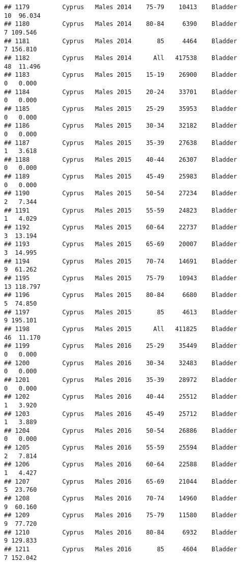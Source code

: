 \documentclass[
]{article}
\begin{document}
\begin{verbatim}
## 1179         Cyprus   Males 2014    75-79    10413    Bladder     10  96.034
## 1180         Cyprus   Males 2014    80-84     6390    Bladder      7 109.546
## 1181         Cyprus   Males 2014       85     4464    Bladder      7 156.810
## 1182         Cyprus   Males 2014      All   417538    Bladder     48  11.496
## 1183         Cyprus   Males 2015    15-19    26900    Bladder      0   0.000
## 1184         Cyprus   Males 2015    20-24    33701    Bladder      0   0.000
## 1185         Cyprus   Males 2015    25-29    35953    Bladder      0   0.000
## 1186         Cyprus   Males 2015    30-34    32182    Bladder      0   0.000
## 1187         Cyprus   Males 2015    35-39    27638    Bladder      1   3.618
## 1188         Cyprus   Males 2015    40-44    26307    Bladder      0   0.000
## 1189         Cyprus   Males 2015    45-49    25983    Bladder      0   0.000
## 1190         Cyprus   Males 2015    50-54    27234    Bladder      2   7.344
## 1191         Cyprus   Males 2015    55-59    24823    Bladder      1   4.029
## 1192         Cyprus   Males 2015    60-64    22737    Bladder      3  13.194
## 1193         Cyprus   Males 2015    65-69    20007    Bladder      3  14.995
## 1194         Cyprus   Males 2015    70-74    14691    Bladder      9  61.262
## 1195         Cyprus   Males 2015    75-79    10943    Bladder     13 118.797
## 1196         Cyprus   Males 2015    80-84     6680    Bladder      5  74.850
## 1197         Cyprus   Males 2015       85     4613    Bladder      9 195.101
## 1198         Cyprus   Males 2015      All   411825    Bladder     46  11.170
## 1199         Cyprus   Males 2016    25-29    35449    Bladder      0   0.000
## 1200         Cyprus   Males 2016    30-34    32483    Bladder      0   0.000
## 1201         Cyprus   Males 2016    35-39    28972    Bladder      0   0.000
## 1202         Cyprus   Males 2016    40-44    25512    Bladder      1   3.920
## 1203         Cyprus   Males 2016    45-49    25712    Bladder      1   3.889
## 1204         Cyprus   Males 2016    50-54    26886    Bladder      0   0.000
## 1205         Cyprus   Males 2016    55-59    25594    Bladder      2   7.814
## 1206         Cyprus   Males 2016    60-64    22588    Bladder      1   4.427
## 1207         Cyprus   Males 2016    65-69    21044    Bladder      5  23.760
## 1208         Cyprus   Males 2016    70-74    14960    Bladder      9  60.160
## 1209         Cyprus   Males 2016    75-79    11580    Bladder      9  77.720
## 1210         Cyprus   Males 2016    80-84     6932    Bladder      9 129.833
## 1211         Cyprus   Males 2016       85     4604    Bladder      7 152.042

\end{verbatim}
\end{document}
